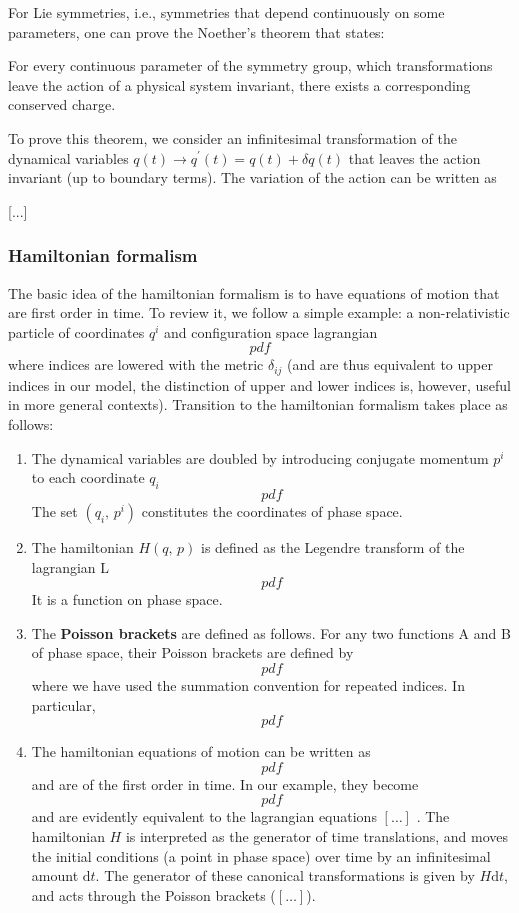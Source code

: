 For Lie symmetries, i.e., symmetries that depend continuously on some parameters, one can prove the Noether’s theorem that states:
\begin{theorem}
    For every continuous parameter of the symmetry group, which transformations leave the action of a physical system invariant, there exists a corresponding conserved charge.
\end{theorem}

To prove this theorem, we consider an infinitesimal transformation of the dynamical variables \(q(t) \to q^{\prime}(t) = q(t) + \delta q(t)\) that leaves the action invariant (up to boundary terms). The variation of the action can be written as

    [...]

\subsubsection{Hamiltonian formalism}

The basic idea of the hamiltonian formalism is to have equations of motion that are first order in time. To review it, we follow a simple example: a non-relativistic particle of coordinates \(q^i\) and configuration space lagrangian
\[
    pdf
\]
where indices are lowered with the metric \(\delta_{ij}\) (and are thus equivalent to upper indices in our model, the distinction of upper and lower indices is, however, useful in more general contexts). Transition to the hamiltonian formalism takes place as follows:
\begin{enumerate}
    \item The dynamical variables are doubled by introducing conjugate momentum \(p^i\) to each coordinate \(q_i\)
          \[
              pdf
          \]
          The set \((q_i,\,p^i)\) constitutes the coordinates of phase space.
    \item The hamiltonian \(H(q,\,p)\) is defined as the Legendre transform of the lagrangian \(\mathrm{L}\)
          \[
              pdf
          \]
          It is a function on phase space.
    \item The \textbf{Poisson brackets} are defined as follows. For any two functions A and B of phase space, their Poisson brackets are defined by
          \[
              pdf
          \]
          where we have used the summation convention for repeated indices. In particular,
          \[
              pdf
          \]
    \item The hamiltonian equations of motion can be written as
          \[
              pdf
          \]
          and are of the first order in time. In our example, they become
          \[
              pdf
          \]
          and are evidently equivalent to the lagrangian equations \([\dots]\) . The hamiltonian \(H\) is interpreted as the generator of time translations, and moves the initial conditions (a point in phase space) over time by an infinitesimal amount \(\mathrm{d} t\). The generator of these canonical transformations is given by \(H \mathrm{d} t\), and acts through the Poisson brackets (\([\dots ]\)).
\end{enumerate}


